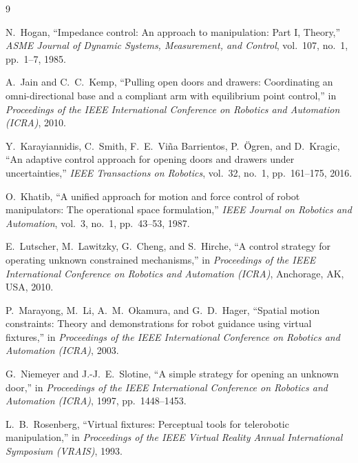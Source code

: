 \documentclass[11pt,a4paper]{article}
\begin{document}
\begin{thebibliography}{9}

N.~Hogan,
``Impedance control: An approach to manipulation: Part I, Theory,''
\textit{ASME Journal of Dynamic Systems, Measurement, and Control},
vol.~107, no.~1, pp.~1--7, 1985.

A.~Jain and C.~C.~Kemp,
``Pulling open doors and drawers: Coordinating an omni-directional base and a compliant arm with
equilibrium point control,''
in \textit{Proceedings of the IEEE International Conference on Robotics and Automation (ICRA)},
2010.

Y.~Karayiannidis, C.~Smith, F.~E.~Vi\~{n}a Barrientos, P.~\"{O}gren, and D.~Kragic,
``An adaptive control approach for opening doors and drawers under uncertainties,''
\textit{IEEE Transactions on Robotics},
vol.~32, no.~1, pp.~161--175, 2016.

O.~Khatib,
``A unified approach for motion and force control of robot manipulators: The operational
space formulation,''
\textit{IEEE Journal on Robotics and Automation},
vol.~3, no.~1, pp.~43--53, 1987.

E.~Lutscher, M.~Lawitzky, G.~Cheng, and S.~Hirche,
``A control strategy for operating unknown constrained mechanisms,''
in \textit{Proceedings of the IEEE International Conference on Robotics and Automation (ICRA)},
Anchorage, AK, USA, 2010.

P.~Marayong, M.~Li, A.~M.~Okamura, and G.~D.~Hager,
``Spatial motion constraints: Theory and demonstrations for robot guidance using virtual
fixtures,''
in \textit{Proceedings of the IEEE International Conference on Robotics and Automation (ICRA)},
2003.

G.~Niemeyer and J.-J.~E.~Slotine,
``A simple strategy for opening an unknown door,''
in \textit{Proceedings of the IEEE International Conference on Robotics and Automation (ICRA)},
1997, pp.~1448--1453.

L.~B.~Rosenberg,
``Virtual fixtures: Perceptual tools for telerobotic manipulation,''
in \textit{Proceedings of the IEEE Virtual Reality Annual International Symposium (VRAIS)},
1993.

\end{thebibliography}
\end{document}
